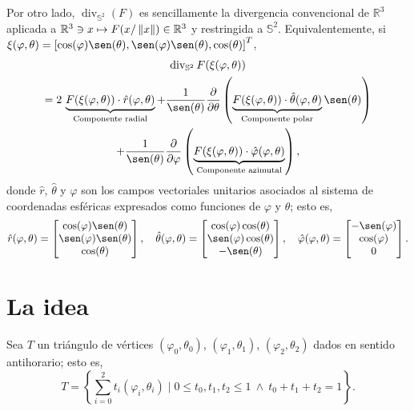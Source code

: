 \documentclass[reqno]{amsart}
\newcommand{\norm}[2][y]{\if#1y\left\fi\lVert#2\if#1y\right\fi\rVert} %
\begin{document}
Por otro lado, $\operatorname{div}_{\mathbb{S}^2}(F)$ es sencillamente la divergencia convencional de $\mathbb{R}^3$ aplicada a $\mathbb{R}^3 \ni x \mapsto F(x/\norm{x}) \in \mathbb{R}^3$ y restringida a $\mathbb{S}^2$.
Equivalentemente, si $\xi(\varphi,\theta) = \left[ \cos(\varphi) \sen(\theta), \sen(\varphi) \sen(\theta), \cos(\theta) \right]^T$,
%
\begin{multline}
\operatorname{div}_{\mathbb{S}^2} F(\xi(\varphi,\theta))\\
= 2 \, \underbrace{F(\xi(\varphi,\theta)) \cdot \hat r(\varphi,\theta)}_{\text{Componente radial}} + \frac{1}{\sen(\theta)} \frac{\partial}{\partial \theta}\left( \underbrace{F(\xi(\varphi,\theta)) \cdot \hat \theta(\varphi,\theta)}_{\text{Componente polar}} \sen(\theta) \right)\\ + \frac{1}{\sen(\theta)} \frac{\partial}{\partial \varphi}\left( \underbrace{F(\xi(\varphi,\theta)) \cdot \hat \varphi(\varphi,\theta)}_{\text{Componente azimutal}} \right),
\end{multline}
%
donde $\hat r$, $\hat \theta$ y $\hat \varphi$ son los campos vectoriales unitarios asociados al sistema de coordenadas esféricas expresados como funciones de $\varphi$ y $\theta$; esto es,
%
\begin{equation*}
\hat r(\varphi,\theta) = \begin{bmatrix} \cos(\varphi) \sen(\theta)\\ \sen(\varphi) \sen(\theta)\\ \cos(\theta) \end{bmatrix}, \quad
\hat \theta(\varphi,\theta) = \begin{bmatrix} \cos(\varphi) \cos(\theta)\\ \sen(\varphi) \cos(\theta)\\ -\sen(\theta) \end{bmatrix}, \quad
\hat \varphi(\varphi,\theta) = \begin{bmatrix} -\sen(\varphi)\\ \cos(\varphi)\\ 0 \end{bmatrix}.
\end{equation*}
%

\section{La idea}

Sea $T$ un triángulo de vértices $(\varphi_0, \theta_0)$, $(\varphi_1, \theta_1)$, $(\varphi_2, \theta_2)$ dados en sentido antihorario; esto es,
%
\begin{equation}\label{T}
T = \left\{ \sum_{i=0}^2 t_i (\varphi_i, \theta_i) \mid 0 \leq t_0, t_1, t_2 \leq 1 \ \wedge \ t_0+t_1+t_2=1 \right\}.
\end{equation}
%
\end{document}
